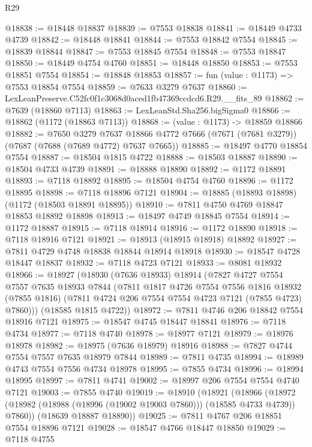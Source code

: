 \begin{lexlean}{R29}
\begin{coremodule}
@18838 := @18448 @18837
@18839 := @7553 @18838
@18841 := @18449 @4733 @4739
@18842 := @18448 @18841
@18844 := @7553 @18842 @7554
@18845 := @18839 @18844
@18847 := @7553 @18845 @7554
@18848 := @7553 @18847
@18850 := @18449 @4754 @4760
@18851 := @18448 @18850
@18853 := @7553 @18851 @7554
@18854 := @18848 @18853
@18857 := fun (value : @1173) => @7553 @18854 @7554
@18859 := @7633 @3279 @7637
@18860 := LexLeanPreserve.C52fc0f1c3068d0aced1fb47369ccdcd6.R29.__fits_89
@18862 := @7639 (@18860 @7113)
@18863 := LexLeanStd.Sha256.bigSigma0
@18866 := @18862 (@1172 (@18863 @7113))
@18868 := (value : @1173) -> @18859 @18866
@18882 := @7650
    @3279
    @7637
    @18866
    @4772
    @7666
    (@7671 (@7681 @3279))
    (@7687 (@7688 (@7689 @4772) @7637 @7665))
@18885 := @18497 @4770 @18854 @7554
@18887 := @18504 @1815 @4722
@18888 := @18503 @18887
@18890 := @18504 @4733 @4739
@18891 := @18888 @18890
@18892 := @1172 @18891
@18893 := @7118 @18892
@18895 := @18504 @4754 @4760
@18896 := @1172 @18895
@18898 := @7118 @18896 @7121
@18904 := @18885 (@18893 @18898) (@1172 (@18503 @18891 @18895))
@18910 := @7811 @4750 @4769 @18847 @18853 @18892 @18898
@18913 := @18497 @4749 @18845 @7554
@18914 := @1172 @18887
@18915 := @7118 @18914
@18916 := @1172 @18890
@18918 := @7118 @18916 @7121
@18921 := @18913 (@18915 @18918) @18892
@18927 := @7811 @4729 @4748 @18838 @18844 @18914 @18918
@18930 := @18547 @4728 @18447 @18837
@18932 := @7118 @4723 @7121
@18933 := @8081 @18932
@18966 := @18927
    (@18930
      (@7636 @18933)
      @18914
      (@7827
        @4727
        @7554
        @7557
        @7635
        @18933
        @7844
        (@7811
          @1817
          @4726
          @7554
          @7556
          @1816
          @18932
          (@7855 @1816)
          (@7811 @4724 @206 @7554 @7554 @4723 @7121 (@7855 @4723) @7860)))
      (@18585 @1815 @4722))
@18972 := @7811 @4746 @206 @18842 @7554 @18916 @7121
@18975 := @18547 @4745 @18447 @18841
@18976 := @7118 @4734
@18977 := @7118 @4740
@18978 := @18977 @7121
@18979 := @18976 @18978
@18982 := @18975 (@7636 @18979) @18916
@18988 := @7827 @4744 @7554 @7557 @7635 @18979 @7844
@18989 := @7811 @4735
@18994 := @18989 @4743 @7554 @7556 @4734 @18978
@18995 := @7855 @4734
@18996 := @18994 @18995
@18997 := @7811 @4741
@19002 := @18997 @206 @7554 @7554 @4740 @7121
@19003 := @7855 @4740
@19019 := @18910
    (@18921
      (@18966 (@18972 (@18982 (@18988 (@18996 (@19002 @19003 @7860))) (@18585 @4733 @4739)) @7860))
      (@18639 @18887 @18890))
@19025 := @7811 @4767 @206 @18851 @7554 @18896 @7121
@19028 := @18547 @4766 @18447 @18850
@19029 := @7118 @4755

\end{coremodule}
\end{lexlean}
